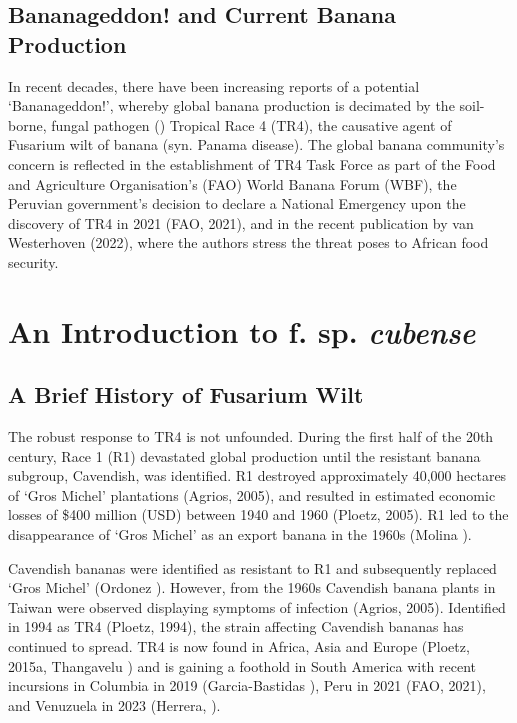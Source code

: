 \subsection{Bananageddon! \textit{\Fo} and Current Banana Production}

In recent decades, there have been increasing reports of a potential ‘Bananageddon!’, whereby global banana production is decimated by the soil-borne, fungal pathogen \textit{\Focub} (\textit{\Foc}) Tropical Race 4 (TR4), the causative agent of Fusarium wilt of banana (syn. Panama disease). The global banana community’s concern is reflected in the establishment of TR4 Task Force as part of the Food and Agriculture Organisation’s (FAO) World Banana Forum (WBF), the Peruvian government’s decision to declare a National Emergency upon the discovery of \Foc TR4 in 2021 (FAO, 2021), and in the recent publication by van Westerhoven \et (2022), where the authors stress the threat \Foc poses to African food security.   

\section{An Introduction to \textit{\Fo} f. sp. \textit{cubense}}

\subsection{A Brief History of Fusarium Wilt}

The robust response to \Foc TR4 is not unfounded. During the first half of the 20th century, \Foc Race 1 (R1) devastated global production until the resistant banana subgroup, Cavendish, was identified. \Foc R1 destroyed approximately 40,000 hectares of ‘Gros Michel’ plantations (Agrios, 2005), and resulted in estimated economic losses of \$400 million (USD) between 1940 and 1960 (Ploetz, 2005). \Foc R1 led to the disappearance of ‘Gros Michel’ as an export banana in the 1960s (Molina ).  

Cavendish bananas were identified as resistant to \Foc R1 and subsequently replaced ‘Gros Michel’ (Ordonez ). However, from the 1960s Cavendish banana plants in Taiwan were observed displaying symptoms of \Foc infection (Agrios, 2005). Identified in 1994 as \Foc TR4 (Ploetz, 1994), the strain affecting Cavendish bananas has continued to spread. \Foc TR4 is now found in Africa, Asia and Europe (Ploetz, 2015a, Thangavelu ) and is gaining a foothold in South America with recent incursions in Columbia in 2019 (Garcia-Bastidas ), Peru in 2021 (FAO, 2021), and Venuzuela in 2023 (Herrera, ).

